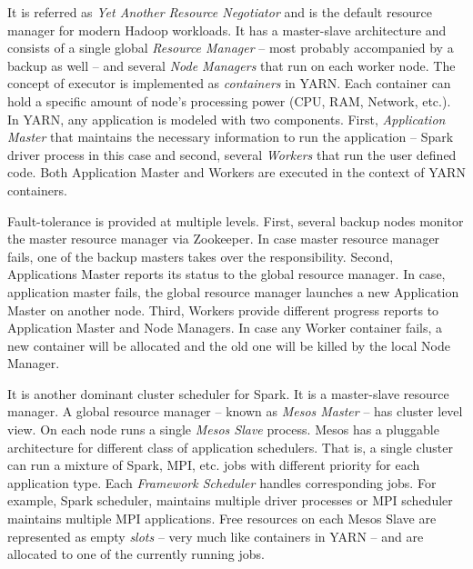 \begin{description}[leftmargin=0pt]
    \item [Apache YARN~\cite{Vavilapalli:2013}] It is referred as \emph{Yet Another Resource Negotiator} and is the default resource manager for modern Hadoop workloads. It has a master-slave architecture and consists of a single global \emph{Resource Manager} -- most probably accompanied by a backup as well --  and several \emph{Node Managers} that run on each worker node. The concept of executor is implemented as \emph{containers} in YARN. Each container can hold a specific amount of node's processing power (CPU, RAM, Network, etc.). In YARN, any application is modeled with two components. First, \emph{Application Master} that maintains the necessary information to run the application -- Spark driver process in this case and second, several \emph{Workers} that run the user defined code. Both Application Master and Workers are executed in the context of YARN containers. 
    
    Fault-tolerance is provided at multiple levels. First, several backup nodes monitor the master resource manager via Zookeeper. In case master resource manager fails, one of the backup masters takes over the responsibility. Second, Applications Master reports its status to the global resource manager. In case, application master fails, the global resource manager launches a new Application Master on another node. Third, Workers provide different progress reports to Application Master and Node Managers. In case any Worker container fails, a new container will be allocated and the old one will be killed by the local Node Manager.
    \item [Apache Mesos~\cite{Hindman:2011}] It is another dominant cluster scheduler for Spark. It is a master-slave resource manager. A global resource manager -- known as \emph{Mesos Master} -- has cluster level view. On each node runs a single \emph{Mesos Slave} process. Mesos has a pluggable architecture for different class of application schedulers. That is, a single cluster can run a mixture of Spark, MPI, etc. jobs with different priority for each application type. Each \emph{Framework Scheduler} handles corresponding jobs. For example, Spark scheduler, maintains multiple driver processes or MPI scheduler maintains multiple MPI applications. Free resources on each Mesos Slave are represented as empty \emph{slots} -- very much like containers in YARN -- and are allocated to one of the currently running jobs.
    

\end{description}
